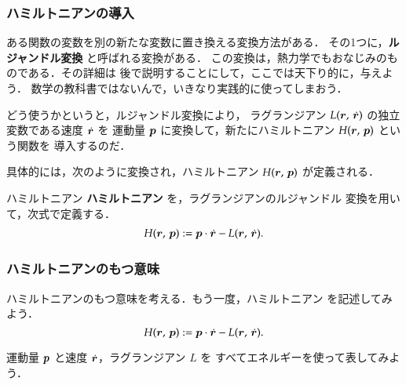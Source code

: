             \subsubsection{ハミルトニアンの導入}
                ある関数の変数を別の新たな変数に置き換える変換方法がある．
                その1つに，\textbf{ルジャンドル変換} と呼ばれる変換がある．
                この変換は，熱力学でもおなじみのものである．その詳細は
                後で説明することにして，ここでは天下り的に，与えよう．
                数学の教科書ではないんで，いきなり実践的に使ってしまおう．

                どう使うかというと，ルジャンドル変換により，
                ラグランジアン $L(\boldsymbol{r},\,\dot{\boldsymbol{r}})$ の独立変数である速度 $\dot{\boldsymbol{r}}$ を
                運動量 $\boldsymbol{p}$ に変換して，新たにハミルトニアン $H(\boldsymbol{r},\,\boldsymbol{p})$ という関数を
                導入するのだ．

                具体的には，次のように変換され，ハミルトニアン $H(\boldsymbol{r},\,\boldsymbol{p})$ が定義される．
                    \begin{myshadebox}{ハミルトニアン}
                        \textbf{ハミルトニアン} を，ラグランジアンのルジャンドル
                        変換を用いて，次式で定義する．
                        \begin{align}
                            H(\boldsymbol{r},\,\boldsymbol{p}) := \boldsymbol{p} \cdot \dot{\boldsymbol{r}} - L(\boldsymbol{r},\,\dot{\boldsymbol{r}}).
                        \end{align}
                    \end{myshadebox}

            \subsubsection{ハミルトニアンのもつ意味}
                ハミルトニアンのもつ意味を考える．もう一度，ハミルトニアン
                を記述してみよう．
                    \begin{equation*}
                        H(\boldsymbol{r},\,\boldsymbol{p}) := \boldsymbol{p} \cdot \dot{\boldsymbol{r}} - L(\boldsymbol{r},\,\dot{\boldsymbol{r}}).
                    \end{equation*}

                運動量 $\boldsymbol{p}$ と速度 $\dot{\boldsymbol{r}}$，ラグランジアン $L$ を
                すべてエネルギーを使って表してみよう．

